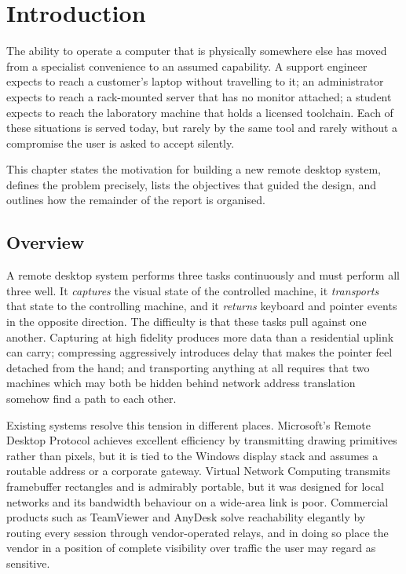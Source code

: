 \chapter{Introduction}

The ability to operate a computer that is physically somewhere else has moved
from a specialist convenience to an assumed capability. A support engineer
expects to reach a customer's laptop without travelling to it; an administrator
expects to reach a rack-mounted server that has no monitor attached; a student
expects to reach the laboratory machine that holds a licensed toolchain. Each of
these situations is served today, but rarely by the same tool and rarely without
a compromise the user is asked to accept silently.

This chapter states the motivation for building a new remote desktop system,
defines the problem precisely, lists the objectives that guided the design, and
outlines how the remainder of the report is organised.

\section{Overview}

A remote desktop system performs three tasks continuously and must perform all
three well. It \emph{captures} the visual state of the controlled machine, it
\emph{transports} that state to the controlling machine, and it \emph{returns}
keyboard and pointer events in the opposite direction. The difficulty is that
these tasks pull against one another. Capturing at high fidelity produces more
data than a residential uplink can carry; compressing aggressively introduces
delay that makes the pointer feel detached from the hand; and transporting
anything at all requires that two machines which may both be hidden behind
network address translation somehow find a path to each other.

Existing systems resolve this tension in different places. Microsoft's Remote
Desktop Protocol achieves excellent efficiency by transmitting drawing
primitives rather than pixels, but it is tied to the Windows display stack and
assumes a routable address or a corporate gateway. Virtual Network Computing
transmits framebuffer rectangles and is admirably portable, but it was designed
for local networks and its bandwidth behaviour on a wide-area link is poor.
Commercial products such as TeamViewer and AnyDesk solve reachability elegantly
by routing every session through vendor-operated relays, and in doing so place
the vendor in a position of complete visibility over traffic the user may regard
as sensitive.

